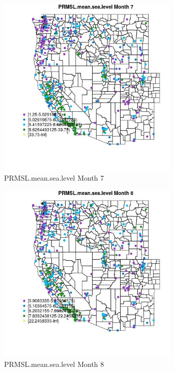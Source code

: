 \begin{figure} 
\centering  
\includegraphics[width=0.77\textwidth]{Code_Outputs/ML_input_report_ML_input_PM25_Step5_part_d_de_duplicated_aves_ML_input_MapObsMo7PRMSLmeansealevel.jpg} 
\caption{\label{fig:ML_input_report_ML_input_PM25_Step5_part_d_de_duplicated_aves_ML_inputMapObsMo7PRMSLmeansealevel}PRMSL.mean.sea.level Month 7} 
\end{figure} 
 

\begin{figure} 
\centering  
\includegraphics[width=0.77\textwidth]{Code_Outputs/ML_input_report_ML_input_PM25_Step5_part_d_de_duplicated_aves_ML_input_MapObsMo8PRMSLmeansealevel.jpg} 
\caption{\label{fig:ML_input_report_ML_input_PM25_Step5_part_d_de_duplicated_aves_ML_inputMapObsMo8PRMSLmeansealevel}PRMSL.mean.sea.level Month 8} 
\end{figure} 
 

